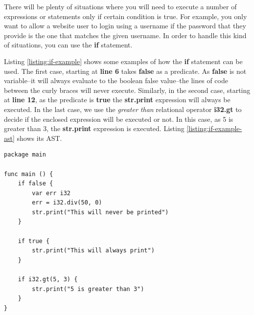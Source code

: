 \documentclass[11pt,fleqn,openany]{book} %
\begin{document}

There will be plenty of situations where you will need to execute a number of expressions or statements only if certain condition is true. For example, you only want to allow a website user to login using a username if the password that they provide is the one that matches the given username. In order to handle this kind of situations, you can use the \textbf{if} statement.

Listing \ref{listing:if-example} shows some examples of how the \textbf{if} statement can be used. The first case, starting at \textbf{line 6} takes \textbf{false} as a predicate. As \textbf{false} is not variable--it will always evaluate to the boolean false value--the lines of code between the curly braces will never execute. Similarly, in the second case, starting at \textbf{line 12}, as the predicate is \textbf{true} the \textbf{str.print} expression will always be executed. In the last case, we use the \textit{greater than} relational operator \textbf{i32.gt} to decide if the enclosed expression will be executed or not. In this case, as 5 is greater than 3, the \textbf{str.print} expression is executed. Listing \ref{listing:if-example-ast} shows its AST.

\begin{lstlisting}[caption={Using 'if' for control flow},captionpos=b,label={listing:if-example}]
package main

func main () {
    if false {
		var err i32
		err = i32.div(50, 0)
		str.print("This will never be printed")
	}

	if true {
		str.print("This will always print")
	}

	if i32.gt(5, 3) {
		str.print("5 is greater than 3")
	}
}
\end{lstlisting}
\end{document}
